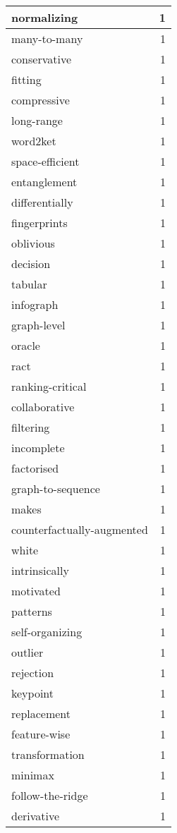 \begin{table}[h]
\begin{tabular}{|l|r|}
\hline
normalizing & 1 \\
\hline
many-to-many & 1 \\
\hline
conservative & 1 \\
\hline
fitting & 1 \\
\hline
compressive & 1 \\
\hline
long-range & 1 \\
\hline
word2ket & 1 \\
\hline
space-efficient & 1 \\
\hline
entanglement & 1 \\
\hline
differentially & 1 \\
\hline
fingerprints & 1 \\
\hline
oblivious & 1 \\
\hline
decision & 1 \\
\hline
tabular & 1 \\
\hline
infograph & 1 \\
\hline
graph-level & 1 \\
\hline
oracle & 1 \\
\hline
ract & 1 \\
\hline
ranking-critical & 1 \\
\hline
collaborative & 1 \\
\hline
filtering & 1 \\
\hline
incomplete & 1 \\
\hline
factorised & 1 \\
\hline
graph-to-sequence & 1 \\
\hline
makes & 1 \\
\hline
counterfactually-augmented & 1 \\
\hline
white & 1 \\
\hline
intrinsically & 1 \\
\hline
motivated & 1 \\
\hline
patterns & 1 \\
\hline
self-organizing & 1 \\
\hline
outlier & 1 \\
\hline
rejection & 1 \\
\hline
keypoint & 1 \\
\hline
replacement & 1 \\
\hline
feature-wise & 1 \\
\hline
transformation & 1 \\
\hline
minimax & 1 \\
\hline
follow-the-ridge & 1 \\
\hline
derivative & 1 \\

\end{tabular}
\end{table}
